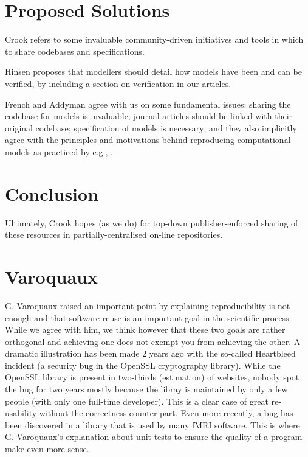 \documentclass[jou]{apa6}
\begin{document}
\section{Proposed Solutions}

Crook refers to some invaluable community-driven initiatives and tools in which to share codebases and specifications.

Hinsen proposes that modellers should detail how models have been and can be verified, by including a section on verification in our articles.

French and Addyman agree with us on some fundamental issues: sharing the codebase for models is invaluable; journal articles should be linked with their original codebase; specification of models is necessary; and they also implicitly agree with the principles and motivations behind reproducing computational models as practiced by e.g., . 

\section{Conclusion}

Ultimately, Crook hopes (as we do) for top-down publisher-enforced sharing of these resources in partially-centralised on-line repositories.



\section{Varoquaux}
G. Varoquaux raised an important point by explaining reproducibility is not
enough and that software reuse is an important goal in the scientific
process. While we agree with him, we think however that these two goals are
rather orthogonal and achieving one does not exempt you from achieving the
other. A dramatic illustration has been made 2 years ago with the so-called
Heartbleed incident (a security bug in the OpenSSL cryptography library). While
the OpenSSL library is present in two-thirds (estimation) of websites, nobody
spot the bug for two years mostly because the libray is maintained by only a
few people (with only one full-time developer). This is a clear case of great
re-usability without the correctness counter-part. Even more recently, a bug
has been discovered in a library that is used by many fMRI software. This is
where G. Varoquaux's explanation about unit tests to ensure the quality of a
program make even more sense.
\end{document}
